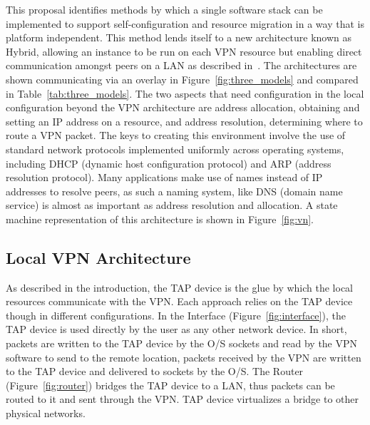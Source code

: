 This proposal identifies methods by which a single software stack can be
implemented to support self-configuration and resource migration in a way that
is platform independent.  This method lends itself to a new architecture known
as Hybrid, allowing an instance to be run on each VPN resource but enabling
direct communication amongst peers on a LAN as described in~\cite{sc09}.  The
architectures are shown communicating via an overlay in
Figure~\ref{fig:three_models} and compared in Table~\ref{tab:three_models}.
The two aspects that need configuration in the local configuration beyond the
VPN architecture are address allocation, obtaining and setting an IP address on
a resource, and address resolution, determining where to route a VPN packet.
The keys to creating this environment involve the use of standard network
protocols implemented uniformly across operating systems, including DHCP
(dynamic host configuration protocol) and ARP (address resolution protocol).
Many applications make use of names instead of IP addresses to resolve peers,
as such a naming system, like DNS (domain name service) is almost as important
as address resolution and allocation.  A state machine representation of this
architecture is shown in
Figure~\ref{fig:vn}.

\subsection{Local VPN Architecture}
As described in the introduction, the TAP device is the glue by which the local
resources communicate with the VPN.  Each approach relies on the TAP device
though in different configurations.  In the Interface
(Figure~\ref{fig:interface}), the TAP device is used directly by the user as
any other network device.  In short, packets are written to the TAP device by
the O/S sockets and read by the VPN software to send to the remote location,
packets received by the VPN are written to the TAP device and delivered to
sockets by the O/S.  The Router (Figure~\ref{fig:router}) bridges the TAP
device to a LAN, thus packets can be routed to it and sent through the VPN.
TAP device virtualizes a bridge to other physical networks.  

